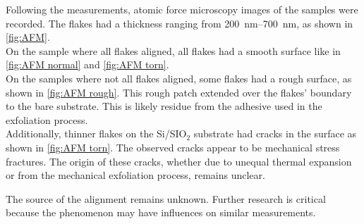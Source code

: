 \documentclass[
	twoside,
	parskip=half,
	a4paper,
]{scrbook}
\begin{document}
Following the measurements, atomic force microscopy images of the samples were recorded.
The flakes had a thickness ranging from \SIrange{200}{700}{nm}, as shown in \autoref{fig:AFM}.\\
On the sample where all flakes aligned, all flakes had a smooth surface like in \autoref{fig:AFM normal} and \autoref{fig:AFM torn}.\\
On the samples where not all flakes aligned, some flakes had a rough surface, as shown in \autoref{fig:AFM rough}.
This rough patch extended over the flakes' boundary to the bare substrate.
This is likely residue from the adhesive used in the exfoliation process.\\
Additionally, thinner flakes on the Si/SIO$_2$ substrate had cracks in the surface as shown in \autoref{fig:AFM torn}.
The observed cracks appear to be mechanical stress fractures.
The origin of these cracks, whether due to unequal thermal expansion or from the mechanical exfoliation process, remains unclear. 

The source of the alignment remains unknown. 
Further research is critical because the phenomenon may have influences on similar measurements.
\end{document}
